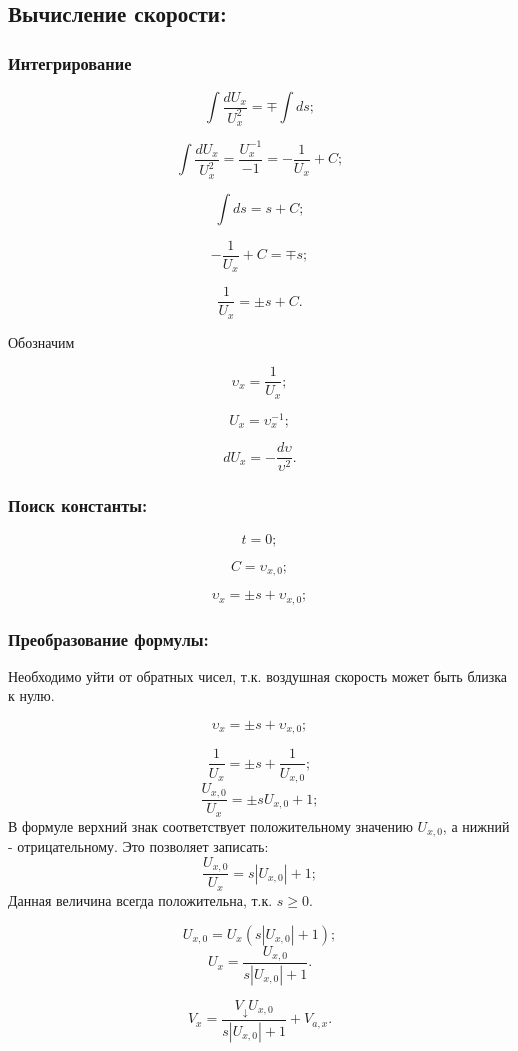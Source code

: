 \subsection{Вычисление скорости:}

\subsubsection{Интегрирование}

$$\int \frac{dU_x}{U_x^2} = \mp \int ds;$$

$$\int \frac{dU_x}{U_x^2} = \frac{U_x^{-1}}{-1} = -\frac{1}{U_x} + C;$$

$$\int ds = s + C;$$

$$-\frac{1}{U_x} + C = \mp s;$$

$$\frac{1}{U_x} = \pm s + C.$$

Обозначим

$$\upsilon_x = \frac{1}{U_x};$$

$$U_x = \upsilon_x^{-1};$$

$$dU_x = -\frac{d\upsilon}{\upsilon^2}.$$

\subsubsection{Поиск константы:}

$$t = 0;$$

$$C = \upsilon_{x,0};$$

$$\upsilon_x = \pm s + \upsilon_{x,0};$$

\subsubsection{Преобразование формулы:}
Необходимо уйти от обратных чисел, т.к. воздушная скорость может быть близка к нулю.

$$\upsilon_x = \pm s + \upsilon_{x,0};$$

$$\frac{1}{U_x} = \pm s + \frac{1}{U_{x,0}};$$
$$\frac{U_{x,0}}{U_x} = \pm sU_{x,0} + 1;$$
В формуле верхний знак соответствует положительному значению $U_{x,0}$, а нижний - отрицательному. Это позволяет записать:
$$\frac{U_{x,0}}{U_x} = s|U_{x,0}| + 1;$$
Данная величина всегда положительна, т.к. $s \ge 0$.

$$U_{x,0} = U_x (s|U_{x,0}| + 1);$$
$$U_x = \frac{U_{x,0}}{s|U_{x,0}| + 1}.$$

$$V_x = \frac{V_\downarrow U_{x,0}}{s|U_{x,0}| + 1} + V_{a,x}.$$
